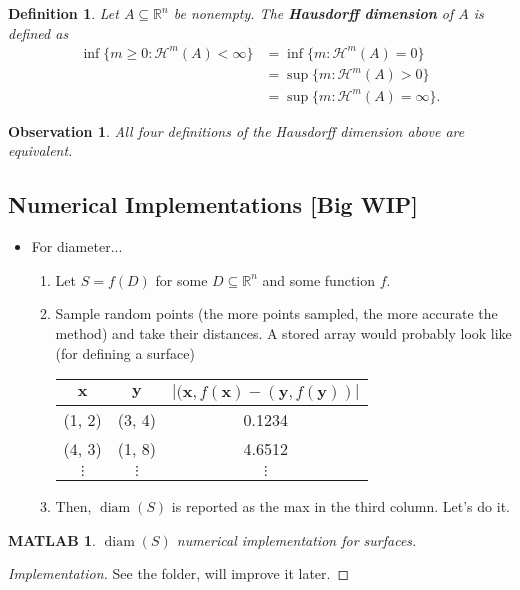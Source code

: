 \documentclass[10pt]{article}
\theoremstyle{plain}
\newtheorem{definition}{Definition}
\newtheorem{observation}{Observation}
\newtheorem{matlab}{MATLAB}
\DeclareMathOperator{\diam}{diam}
\begin{document}
	\begin{definition}
		Let $A \subseteq \mathbb{R}^n$ be nonempty. The \textbf{\textit{Hausdorff dimension}} of $A$ is defined as 
			\begin{align*}
				\inf\{m \geq 0 : \mathcal{H}^m(A) < \infty\} &= \inf \{m : \mathcal{H}^m(A) = 0\} \\ 
				&= \sup \{m : \mathcal{H}^m(A) > 0\} \\
				&= \sup \{m : \mathcal{H}^m(A) = \infty\}.
			\end{align*}
	\end{definition}


	\begin{observation}
		All four definitions of the Hausdorff dimension above are equivalent.
	\end{observation}

\subsection*{Numerical Implementations [Big WIP]}
	\begin{itemize}
		\item For diameter...
			\begin{enumerate}
				\item Let $S = f(D)$ for some $D \subseteq \mathbb{R}^n$ and some function $f$. 
				
				\item Sample random points (the more points sampled, the more accurate the method) and take their distances. A stored array would probably look like (for defining a surface)
					
					\begin{table}[H]
						\centering 
						\begin{tabular}{c|c|c}
							$\mathbf{x}$ & $\mathbf{y}$ & $|(\mathbf{x}, f(\mathbf{x}) - (\mathbf{y}, f(\mathbf{y}))|$ \\
							\hline  
							(1, 2) & (3, 4) & 0.1234 \\
							(4, 3) & (1, 8) & 4.6512 \\
							$\vdots$ & $\vdots$ & $\vdots$ 
						\end{tabular}						
					\end{table}
				
				\item Then, $\diam(S)$ is reported as the max in the third column. Let's do it.
			\end{enumerate}
	\end{itemize}

	\begin{matlab}
		$\diam(S)$ numerical implementation for surfaces. 
	\end{matlab}
		\begin{proof}[Implementation]
			See the folder, will improve it later. 
		\end{proof}
\end{document}
